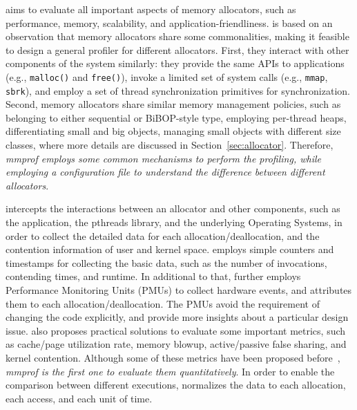 \MP{} aims to evaluate all important aspects of memory allocators, such as performance, memory, scalability, and application-friendliness. \MP{} is based on an observation that memory allocators share some commonalities, making it feasible to design a general profiler for different allocators. First, they interact with other components of the system similarly: they provide the same APIs to applications (e.g., \texttt{malloc()} and \texttt{free()}), invoke a limited set of system calls (e.g., \texttt{mmap}, \texttt{sbrk}), and employ a set of thread synchronization primitives for  synchronization. Second, memory allocators share similar memory management policies, such as belonging to either sequential or BiBOP-style type, employing per-thread heaps, differentiating small and big objects, managing small objects with different size classes, where more details are discussed in Section~\ref{sec:allocator}. Therefore, \textit{mmprof employs some common mechanisms to perform the profiling, while employing a configuration file to understand the difference between different allocators}.    

\MP{} intercepts the interactions between an allocator and other components, such as the application, the pthreads library, and the underlying Operating Systems, in order to collect the detailed data for each allocation/deallocation, and the contention information of user and kernel space. 
 \MP{} employs simple counters and timestamps for collecting the basic data, such as the number of invocations, contending times, and runtime. In additional to that, \MP{} further employs Performance Monitoring Units (PMUs) to collect hardware events, and attributes them to each allocation/deallocation. The PMUs avoid the requirement of changing the code explicitly, and provide more insights about a particular design issue. \MP{} also proposes practical solutions to evaluate some important metrics, such as cache/page utilization rate, memory blowup, active/passive false sharing, and kernel contention. Although some of these metrics have been proposed before~\cite{Hoard}, \textit{mmprof is the first one to evaluate them quantitatively}. In order to enable the comparison between different executions, \MP{} normalizes the data to each allocation, each access, and each unit of time.  



